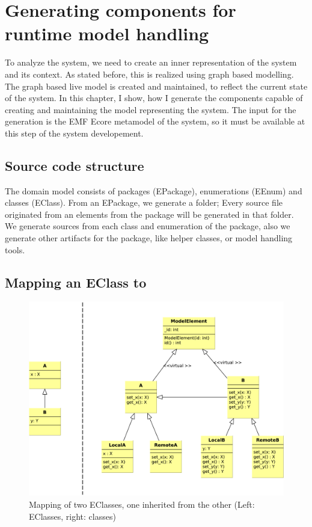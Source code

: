 \chapter{Generating components for runtime model handling}

To analyze the system, we need to create an inner representation of the system and its context. 
As stated before, this is realized using graph based modelling. 
The graph based live model is created and maintained, to reflect the current state of the system. 
In this chapter, I show, how I generate the \cpp{} components capable of creating and maintaining the model representing the system. 
The input for the generation is the EMF Ecore metamodel of the system, so it must be available at this step of the system developement. 


\section{Source code structure}

The domain model consists of packages (EPackage), enumerations (EEnum) and classes (EClass).
From an EPackage, we generate a folder; Every source file originated from an elements from the package will be generated in that folder. 
We generate sources from each class and enumeration of the package, also we generate other artifacts for the package, like helper classes, or model handling tools.


\section{Mapping an EClass to \protect\cpp }


\begin{figure}
	\begin{center}
		\includegraphics[width=\textwidth]{figures/eclass-to-cpp.pdf}
		\caption{Mapping of two EClasses, one inherited from the other (Left: EClasses, right: \protect\cpp{} classes) }
		\label{fig:eclass-to-cpp}
	\end{center}
\end{figure}


